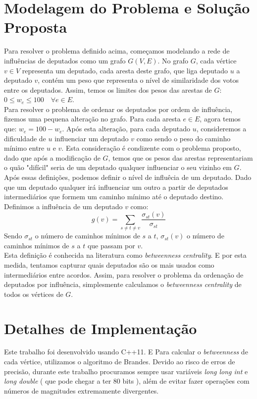 \documentclass[10pt]{article}
\begin{document}
\section{Modelagem do Problema e Solução Proposta}
Para resolver o problema definido acima, começamos modelando a rede de influências de deputados como um grafo $G(V, E)$. No grafo $G$, cada vértice $v \in V$ representa um deputado, cada aresta deste grafo, que liga deputado $u$ a deputado $v$, contém um peso que representa o nível de similaridade dos votos entre os deputados. Assim, temos os limites dos pesos das arestas de $G$: $0 \leq w_e \leq 100 \quad \forall e \in E$.\\
Para resolver o problema de ordenar os deputados por ordem de influência, fizemos uma pequena alteração no grafo. Para cada aresta $e \in E$, agora temos que: $w_e = 100 - w_e$. Após esta alteração, para cada deputado $u$, consideremos a dificuldade de $u$ influenciar um deputado $v$ como sendo o peso do caminho mínimo entre $u$ e $v$. Esta consideração é condizente com o problema proposto, dado que após a modificação de $G$, temos que os pesos das arestas representariam o quão "difícil" seria de um deputado qualquer influenciar o seu vizinho em $G$.\\
Após essas definições, podemos definir o nível de influêcia de um deputado. Dado que um deputado qualquer irá influenciar um outro a partir de deputados intermediários que formem um caminho mínimo até o deputado destino. Definimos a influência de um deputado $v$ como:
$$g(v) = \sum_{s \neq t \neq v} \frac{\sigma_{st}(v)}{\sigma_{st}}$$
Sendo $\sigma_{st}$ o número de caminhos mínimos de $s$ a $t$, $\sigma_{st}(v)$ o número de caminhos mínimos de $s$ a $t$ que passam por $v$.\\
Esta definição é conhecida na literatura como \textit{betweenness centrality}. E por esta medida, tentamos capturar quais deputados são os mais usados como intermediários entre acordos. Assim, para resolver o problema da ordenação de deputados por influência, simplesmente calculamos o \textit{betweenness centrality} de todos os vértices de $G$.


\section{Detalhes de Implementação}
Este trabalho foi desenvolvido usando C++11.
E Para calcular o \textit{betweenness} de cada vértice, utilizamos o algoritmo de Brandes\cite{brandes2001faster}. Devido ao risco de erros de precisão, durante este trabalho procuramos sempre usar variáveis \textit{long long int} e \textit{long double} ( que pode chegar a ter 80 bits )\cite{longDoubleWiki}, além de evitar fazer operações com números de magnitudes extremamente divergentes.
\end{document}
